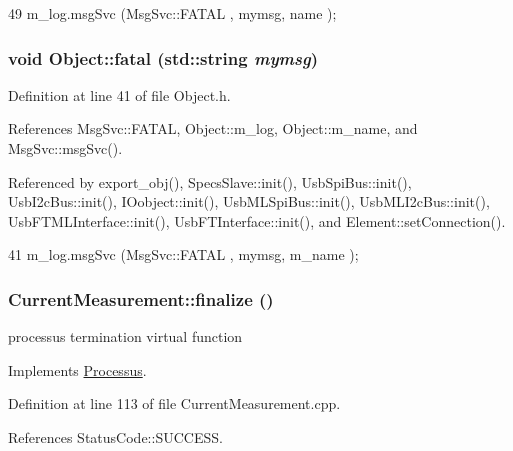 \begin{DoxyCode}
49 { m_log.msgSvc (MsgSvc::FATAL   , mymsg, name ); }
\end{DoxyCode}
\hypertarget{classObject_aad5a16aac7516ce65bd5ec02ab07fc80}{
\subsubsection[{fatal}]{\setlength{\rightskip}{0pt plus 5cm}void Object::fatal (std::string {\em mymsg})}}
\label{classObject_aad5a16aac7516ce65bd5ec02ab07fc80}


Definition at line 41 of file Object.h.

References MsgSvc::FATAL, Object::m\_\-log, Object::m\_\-name, and MsgSvc::msgSvc().

Referenced by export\_\-obj(), SpecsSlave::init(), UsbSpiBus::init(), UsbI2cBus::init(), IOobject::init(), UsbMLSpiBus::init(), UsbMLI2cBus::init(), UsbFTMLInterface::init(), UsbFTInterface::init(), and Element::setConnection().


\begin{DoxyCode}
41 { m_log.msgSvc (MsgSvc::FATAL   , mymsg, m_name ); }
\end{DoxyCode}
\hypertarget{classCurrentMeasurement_af87fa329a11212c10e878568bcecaeb3}{
\subsubsection[{finalize}]{ CurrentMeasurement::finalize ()}}
\label{classCurrentMeasurement_af87fa329a11212c10e878568bcecaeb3}
processus termination virtual function 

Implements \hyperlink{classProcessus_aba93d691f031bdb18ae4b8afb1b2e856}{Processus}.

Definition at line 113 of file CurrentMeasurement.cpp.

References StatusCode::SUCCESS.


